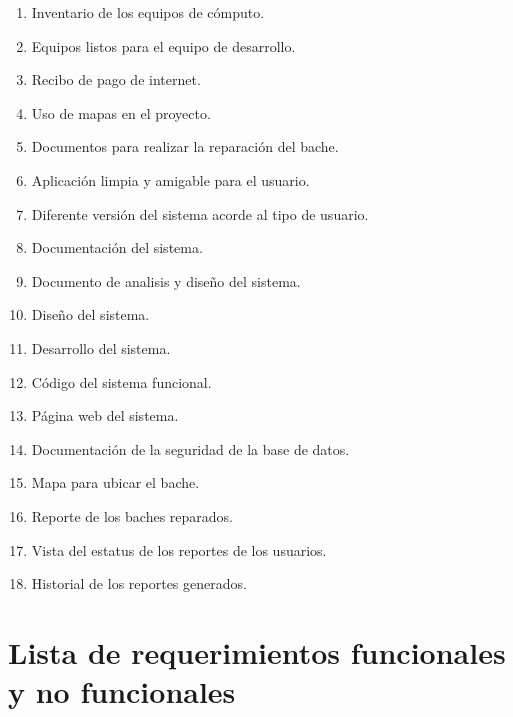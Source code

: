 \documentclass[12pt,twoside, a4paper]{article}
\begin{document}
\begin{enumerate}
    \item Inventario de los equipos de cómputo.
    \item Equipos listos para el equipo de desarrollo.
    \item Recibo de pago de internet.
    \item Uso de mapas en el proyecto.
    \item Documentos para realizar la reparación del bache.
    \item Aplicación limpia y amigable para el usuario.
    \item Diferente versión del sistema acorde al tipo de usuario.
    \item Documentación del sistema.
    \item Documento de analisis y diseño del sistema.
    \item Diseño del sistema.
    \item Desarrollo del sistema.
    \item Código del sistema funcional.
    \item Página web del sistema.
    \item Documentación de la seguridad de la base de datos.
    \item Mapa para ubicar el bache.
    \item Reporte de los baches reparados.
    \item Vista del estatus de los reportes de los usuarios.
    \item Historial de los reportes generados.
\end{enumerate}
\newpage
\section{Lista de requerimientos funcionales y no funcionales}
\end{document}
